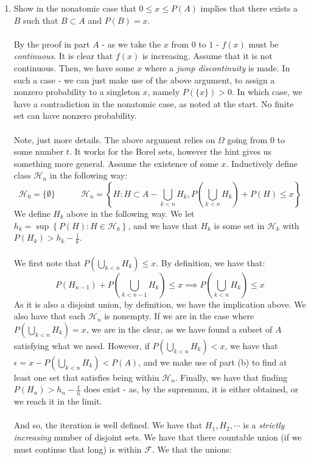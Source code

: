 \documentclass[12pt,a4paper]{article}
\newcommand{\1}[1]{\mathbbm{1}\left\{ #1 \right\}}
\newcommand{\fcal}{\mathcal{F}}
\newcommand{\hcal}{\mathcal{H}}
\begin{document}
\begin{enumerate}
	\item Show in the nonatomic case that $0 \leq x \leq P(A)$ implies that there exists a $B$ such that $B \subset A$ and $P(B) = x$.
	\\\\
	By the proof in part $A$ - as we take the $x$ from $0$ to $1$ - $f(x)$ must be \textit{continuous}. It is clear that $f(x)$ is increasing. Assume that it is not continuous. Then, we have some $x$ where a \textit{jump discontinuity} is made. In such a case - we can just make use of the above argument, to assign a nonzero probability to a singleton $x$, namely $P(\{x\}) > 0$. In which case, we have a contradiction in the nonatomic case, as noted at the start. No finite set can have nonzero probability.
	\\\\
	Note, just more details. The above argument relies on $\Omega$ going from $0$ to some number $t$. It works for the Borel sets, however the hint gives us something more general. Assume the existence of some $x$. Inductively define class $\hcal_n$ in the following way:
	$$
		\hcal_0 = \{\emptyset\} \quad\quad\quad
		\hcal_n = \left\{H: H \subset A - \bigcup_{k < n} H_k, P\left(\bigcup_{k < n} H_k\right) + P(H) \leq x\right\}
	$$
	We define $H_k$ above in the following way. We let $h_k = \sup\left\{P(H) : H \in \hcal_k\right\}$, and we have that $H_k$ is some set in $\hcal_k$ with $P(H_k) > h_k - \frac{1}{k}$.
	\\\\
	We first note that $P\left(\bigcup_{k < n} H_k\right) \leq x$. By definition, we have that:
	$$
		P(H_{n-1}) + P\left(\bigcup_{k < n - 1} H_k\right) \leq x \implies
		P\left(\bigcup_{k < n} H_k\right) \leq x
	$$
	As it is also a disjoint union, by definition, we have the implication above. We also have that each $\hcal_n$ is nonempty. If we are in the case where $P\left(\bigcup_{k < n} H_k\right) = x$, we are in the clear, as we have found a subset of $A$ satisfying what we need. However, if $P\left(\bigcup_{k < n} H_k\right) < x$, we have that $\epsilon = x - P\left(\bigcup_{k < n} H_k\right) < P(A)$, and we make use of part (b) to find at least one set that satisfies being within $\hcal_n$. Finally, we have that finding $P(H_n) > h_n - \frac{1}{n}$ does exist - as, by the supremum, it is either obtained, or we reach it in the limit. 
	\\\\
	And so, the iteration is well defined. We have that $H_1, H_2, \cdots$ is a \textit{strictly increasing} number of disjoint sets. We have that there countable union (if we must continue that long) is within $\fcal$. We that the unions:

\end{enumerate}
\end{document}
